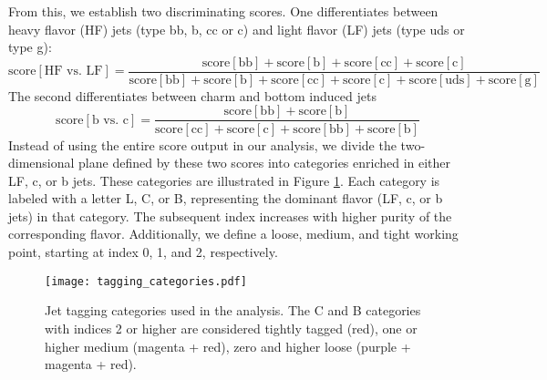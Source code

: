 From this, we establish two discriminating scores. One differentiates between heavy flavor (HF) jets  (type bb, b, cc or c) and light flavor (LF) jets (type uds or type g):
\[\mathrm{score}[\text{HF vs. LF}] =  \frac{\mathrm{score}[\text{bb}] + \mathrm{score}[\text{b}] + \mathrm{score}[\text{cc}] + \mathrm{score}[\text{c}]}{\mathrm{score}[\text{bb}] + \mathrm{score}[\text{b}] + \mathrm{score}[\text{cc}] + \mathrm{score}[\text{c}] + \mathrm{score}[\text{uds}] + \mathrm{score}[\text{g}]}\]
The second differentiates between charm and bottom induced jets
\[\mathrm{score}[\text{b vs. c}]  = \frac{\mathrm{score}[\text{bb}] + \mathrm{score}[\text{b}]}{ \mathrm{score}[\text{cc}] + \mathrm{score}[\text{c}] + \mathrm{score}[\text{bb}] + \mathrm{score}[\text{b}]}\]
Instead of using the entire score output in our analysis, we divide the two-dimensional plane defined by these two scores into categories enriched in  either LF, c, or b jets. These categories are illustrated in Figure \ref{fig:object:taggingcategories}. Each category is labeled with a letter L, C, or B, representing the dominant flavor (LF, c, or b jets) in that category. The subsequent index increases with higher purity of the corresponding flavor. Additionally, we define a loose, medium, and tight working point, starting at index 0, 1, and 2, respectively.
\begin{figure}[H]
	\centering
	\texttt{[image: tagging\_categories.pdf]}
	\caption{Jet tagging categories used in the analysis. The C and B categories with indices 2 or higher are considered tightly tagged (red), one or higher medium (magenta + red), zero and higher loose (purple + magenta + red).}
	\label{fig:object:taggingcategories}
\end{figure}

